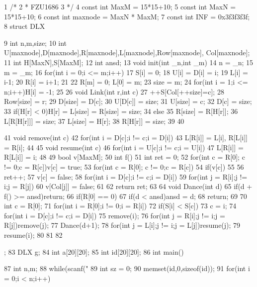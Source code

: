 \documentclass[11pt]{article}
\begin{document}
\begin{Code}
 1   /*
 2    * FZU1686
 3    */
 4   const int MaxM = 15*15+10;
 5   const int MaxN = 15*15+10;
 6   const int maxnode = MaxN * MaxM;
 7   const int INF = 0x3f3f3f3f;
 8   struct DLX{
 9       int n,m,size;
10       int U[maxnode],D[maxnode],R[maxnode],L[maxnode],Row[maxnode],
            Col[maxnode];
11       int H[MaxN],S[MaxM];
12       int ansd;
13       void init(int _n,int _m){
14           n = _n;
15           m = _m;
16           for(int i = 0;i <= m;i++){
17               S[i] = 0;
18               U[i] = D[i] = i;
19               L[i] = i-1;
20               R[i] = i+1;
21           }
22           R[m] = 0; L[0] = m;
23           size = m;
24           for(int i = 1;i <= n;i++)H[i] = -1;
25       }
26       void Link(int r,int c){
27           ++S[Col[++size]=c];
28           Row[size] = r;
29           D[size] = D[c];
30           U[D[c]] = size;
31           U[size] = c;
32           D[c] = size;
33           if(H[r] < 0)H[r] = L[size] = R[size] = size;
34           else{
35               R[size] = R[H[r]];
36               L[R[H[r]]] = size;
37               L[size] = H[r];
38               R[H[r]] = size;
39           }
40       }


41       void remove(int c){
42           for(int i = D[c];i != c;i = D[i])
43                L[R[i]] = L[i], R[L[i]] = R[i];
44       }
45       void resume(int c){
46           for(int i = U[c];i != c;i = U[i])
47                L[R[i]] = R[L[i]] = i;
48       }
49       bool v[MaxM];
50       int f(){
51           int ret = 0;
52           for(int c = R[0]; c != 0;c = R[c])v[c] = true;
53           for(int c = R[0]; c != 0;c = R[c])
54                if(v[c])
55                {
56                    ret++;
57                    v[c] = false;
58                    for(int i = D[c];i != c;i = D[i])
59                         for(int j = R[i];j != i;j = R[j])
60                             v[Col[j]] = false;
61                }
62           return ret;
63       }
64       void Dance(int d){
65           if(d + f() >= ansd)return;
66           if(R[0] == 0){
67                if(d < ansd)ansd = d;
68                return;
69           }
70           int c = R[0];
71           for(int i = R[0];i != 0;i = R[i])
72                if(S[i] < S[c])
73                    c = i;
74           for(int i = D[c];i != c;i = D[i]){
75                remove(i);
76                for(int j = R[i];j != i;j = R[j])remove(j);
77                Dance(d+1);
78                for(int j = L[i];j != i;j = L[j])resume(j);
79                resume(i);
80           }
81       }
82   };
83   DLX g;
84   int a[20][20];
85   int id[20][20];
86   int main(){
87       int n,m;
88       while(scanf("%
89           int sz = 0;
90           memset(id,0,sizeof(id));
91           for(int i = 0;i < n;i++)


}
\end{Code}
\end{document}
